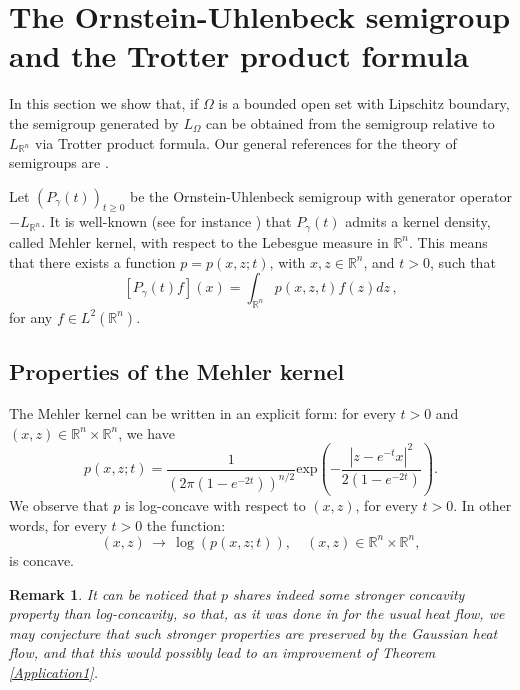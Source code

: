 \documentclass[12pt]{amsart}
\newtheorem{remark}[theorem]{Remark}
\newcommand{\R}{\mathbb R}
\newcommand{\1}{\mathbf 1}
\begin{document}
\section{The Ornstein-Uhlenbeck semigroup and the Trotter product formula}\label{Se3}

In this section we show that, if $\Omega$ is a bounded open set with Lipschitz boundary, the semigroup generated by $L_\Omega$ can be obtained from the semigroup relative to $L_{\R^n}$ via Trotter product formula. Our general references for the theory of semigroups are \cite{Arendt-handbook,Pazy1983}.

Let $(P_\gamma(t))_{t\geq 0}$ be the Ornstein-Uhlenbeck semigroup with generator operator $-L_{\R^n}$. It is well-known (see for instance \cite{Book-Markov-Diffu}) that $P_\gamma(t)$ admits a kernel density, called Mehler kernel, with respect to the Lebesgue measure in $\R^n$. This means that there exists a function $p=p(x,z;t)$, with $x,z\in\R^n$, and $t>0$, such that
\begin{equation}\label{Pf}
[P_\gamma(t)f](x)=\int_{\R^n}p(x,z,t)f(z)dz\,,
\end{equation}
for any $f\in L^2(\R^n)$.

\subsection{Properties of the Mehler kernel}

The Mehler kernel can be written in an explicit form: for every $t>0$ and $(x,z)\in \R^n \times \R^n$, we have
\begin{equation}\label{heat-kernel-2}
p(x,z;t)=\frac{1}{(2\pi(1-e^{-2t}))^{n/2}} \mbox{exp} \left( -\frac{|z-e^{-t}x|^2}{2(1-e^{-2t})}\right).
\end{equation}
We observe that $p$ is log-concave with respect to $(x,z)$, for every $t>0$. In other words, for every $t>0$ the function:
$$
(x,z)\, \rightarrow\,\log(p(x,z;t)),\quad(x,z)\in\R^n\times\R^n,
$$
is concave.
\begin{remark}
It can be noticed that $p$ shares indeed some stronger concavity property than log-concavity, so that, as it was done in \cite{IST2020, IST2024} for the usual heat flow, we may conjecture that such stronger properties are preserved by the Gaussian heat flow, and that this would possibly lead to an improvement of Theorem \ref{Application1}.
\end{remark}
\end{document}
